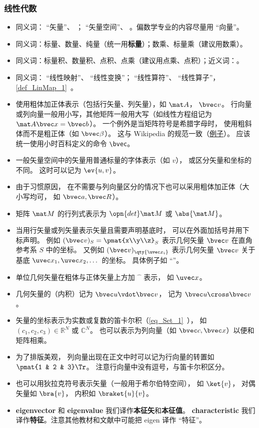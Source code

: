 \subsubsection{线性代数}
\begin{itemize}
\item 同义词： “矢量”、 ； “矢量空间”、 。偏数学专业的内容尽量用 “向量”。
\item 同义词：标量、数量、纯量（统一用\textbf{标量}）；数乘、标量乘（建议用数乘）。
\item 同义词：标量积、数量积、点积、点乘（建议用点乘、点积）；近义词：。
\item 同义词： “线性映射”、 “线性变换”； “线性算符”、 “线性算子”，\autoref{def_LinMap_1}~。
\item 使用粗体加正体表示（包括行矢量、列矢量），如 $\mat A$， $\bvec v$。 行向量或列向量一般用小写，其他矩阵一般用大写（如线性方程组记为 $\mat A \bvec x = \bvec b$）。 一个例外是当矩阵符号是希腊字母时， 使用粗斜体而不是粗正体（如 $\bvec \beta$）。 这与 Wikipedia 的规范一致（\href{https://en.wikipedia.org/wiki/Angular_acceleration}{例子}）。 应该统一使用小时百科定义的命令 \verb|\bvec|。
\item 一般矢量空间中的矢量用普通标量的字体表示（如 $v$）， 或区分矢量和坐标的不同。 这时可以记为 $\ev{u, v}$。
\item 由于习惯原因， 在不需要与列向量区分的情况下也可以采用粗体加正体（大小写均可， 如 $\bvec a, \bvec R$）。
\item 矩阵 $\mat M$ 的行列式表示为 $\opn{det}\mat M$ 或 $\abs{\mat M}$。
\item 当用行矢量或列矢量表示矢量且需要声明基底时， 可以在外面加括号并用下标声明。 例如 $(\bvec v)_S = \pmat{x\\y\\z}_S$ 表示几何矢量 $\bvec v$ 在直角参考系 $S$ 中的坐标。 又例如 $(\bvec v)_{\qty{\uvec x_i}}$ 表示几何矢量 $\bvec v$ 关于基底 $\uvec x_1, \uvec x_2, \dots$ 的坐标。 具体例子如 “”。
\item 单位几何矢量在粗体与正体矢量上方加 $\hat{\phantom{x}}$ 表示， 如 $\uvec x$。
\item 几何矢量的（内积）记为 $\bvec u \vdot \bvec v$， 记为 $\bvec u \cross \bvec v$。
\item 矢量的坐标表示为实数或复数的笛卡尔积（\autoref{eq_Set_1}~）， 如 $(c_1, c_2, c_3) \in  \mathbb R^N$ 或 $\mathbb C^N$。 也可以表示为列向量（如 $\bvec c, \bvec x$）以便和矩阵相乘。
\item 为了排版美观， 列向量出现在正文中时可以记为行向量的转置如 $\pmat{1 & 2 & 3}\Tr$。 注意行向量中没有逗号，与笛卡尔积区分。
\item 也可以用狄拉克符号表示矢量（一般用于希尔伯特空间）， 如 $\ket{v}$， 对偶矢量如 $\bra{v}$， 内积如 $\braket{u}{v}$。
\item \textbf{eigenvector} 和 \textbf{eigenvalue} 我们译作\textbf{本征矢}和\textbf{本征值}。 \textbf{characteristic} 我们译作\textbf{特征}。注意其他教材和文献中可能把 eigen 译作 “特征”。
\end{itemize}


